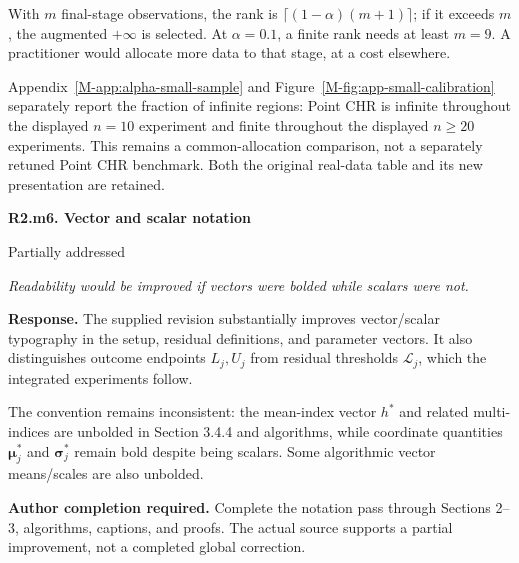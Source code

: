 \documentclass[11pt]{article}
\newcommand{\msapp}[1]{Appendix~\ref*{M-#1}}
\newcommand{\msfig}[1]{Figure~\ref*{M-#1}}
\newcommand{\action}[1]{\par{\small\color{ActionRed}\textbf{Author completion required.} #1\par}}
\newcommand{\point}[3]{\par\Needspace{7\baselineskip}\medskip
\noindent\parbox[t]{0.77\linewidth}{\textbf{#1}}\hfill
\parbox[t]{0.21\linewidth}{\raggedleft\small\sffamily #2}\par\nopagebreak
{\color{ReviewerBlue}\small\itshape #3\par}\textbf{Response.} }
\begin{document}
With $m$ final-stage observations, the rank is $\lceil(1-\alpha)(m+1)\rceil$; if it exceeds $m$, the augmented $+\infty$ is selected. At $\alpha=0.1$, a finite rank needs at least $m=9$. A practitioner would allocate more data to that stage, at a cost elsewhere.

\msapp{app:alpha-small-sample} and \msfig{fig:app-small-calibration} separately report the fraction of infinite regions: Point CHR is infinite throughout the displayed $n=10$ experiment and finite throughout the displayed $n\geq20$ experiments. This remains a common-allocation comparison, not a separately retuned Point CHR benchmark. Both the original real-data table and its new presentation are retained.

\point{R2.m6. Vector and scalar notation}{Partially addressed}{Readability would be improved if vectors were bolded while
scalars were not.}
\label{response:R2.m6}
The supplied revision substantially improves vector/scalar typography in the setup, residual definitions, and parameter vectors. It also distinguishes outcome endpoints $L_j,U_j$ from residual thresholds $\mathcal L_j$, which the integrated experiments follow.

The convention remains inconsistent: the mean-index vector $h^*$ and related multi-indices are unbolded in Section 3.4.4 and algorithms, while coordinate quantities $\boldsymbol\mu_j^*$ and $\boldsymbol\sigma_j^*$ remain bold despite being scalars. Some algorithmic vector means/scales are also unbolded.

\action{Complete the notation pass through Sections 2--3, algorithms, captions, and proofs. The actual source supports a partial improvement, not a completed global correction.}
\end{document}
